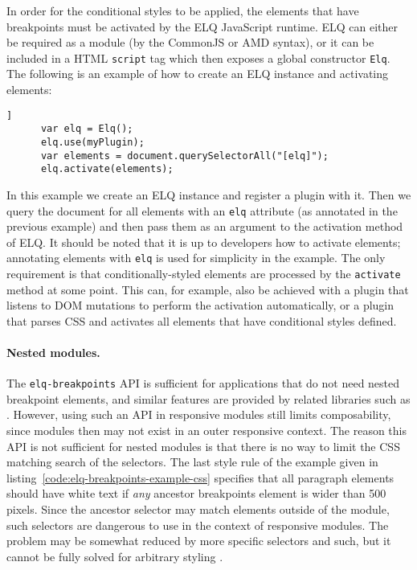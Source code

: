 \documentclass{llncs}
\newcommand{\code}[1]{\texttt{#1}}
\newcommand{\elq}{ELQ}
\begin{document}
    \noindent
    In order for the conditional styles to be applied, the elements that have breakpoints must be activated by the \elq{} JavaScript runtime.
    \elq{} can either be required as a module (by the CommonJS or AMD syntax), or it can be included in a HTML \code{script} tag which then exposes a global constructor \code{Elq}.
    The following is an example of how to create an \elq{} instance and activating elements:

    \begin{lstlisting}[gobble=6,caption={}]]
      var elq = Elq();
      elq.use(myPlugin);
      var elements = document.querySelectorAll("[elq]");
      elq.activate(elements);
    \end{lstlisting}

    \noindent
    In this example we create an \elq{} instance and register a plugin with it.
    Then we query the document for all elements with an \code{elq} attribute (as annotated in the previous example) and then pass them as an argument to the activation method of \elq{}.
    It should be noted that it is up to developers how to activate elements; annotating elements with \code{elq} is used for simplicity in the example.
    The only requirement is that conditionally-styled elements are processed by the \code{activate} method at some point.
    This can, for example, also be achieved with a plugin that listens to DOM mutations to perform the activation automatically, or a plugin that parses CSS and activates all elements that have conditional styles defined.

    \paragraph{Nested modules.}
      The \code{elq-breakpoints} API is sufficient for applications that do not need nested breakpoint elements, and similar features are provided by related libraries such as \cite{eq_imp_eqjs,eq_imp_responsive-elements-2}.
      However, using such an API in responsive modules still limits composability, since modules then may not exist in an outer responsive context.
      The reason this API is not sufficient for nested modules is that there is no way to limit the CSS matching search of the selectors.
      The last style rule of the example given in listing~\ref{code:elq-breakpoints-example-css} specifies that all paragraph elements should have white text if \emph{any} ancestor breakpoints element is wider than 500 pixels.
      Since the ancestor selector may match elements outside of the module, such selectors are dangerous to use in the context of responsive modules.
      The problem may be somewhat reduced by more specific selectors and such, but it cannot be fully solved for arbitrary styling \cite{elq-thesis}.
\end{document}
